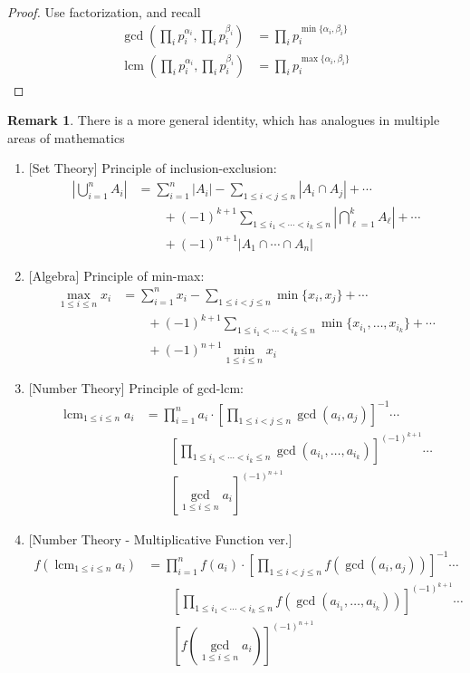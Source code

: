 \documentclass{article}
\theoremstyle{definition}
\newtheorem{remark}[theorem]{Remark}
\begin{document}
\begin{proof}
Use factorization, and recall
\begin{align*}
\gcd \left( \prod_i p_i^{\alpha_i}, \prod_i p_i^{\beta_i} \right) & = \prod_i p_i^{\min \{ \alpha_i, \beta_i \}}
\\
\operatorname{lcm} \left( \prod_i p_i^{\alpha_i}, \prod_i p_i^{\beta_i} \right) & = \prod_i p_i^{\max \{ \alpha_i, \beta_i \}}
\end{align*}
\end{proof}
\begin{remark}
There is a more general identity, which has analogues in multiple areas of mathematics
\begin{enumerate}
	\item {[Set Theory]} Principle of inclusion-exclusion:
	\begin{align*}
	\left| \bigcup_{i = 1}^n A_i \right| & = \sum_{i = 1}^n |A_i| - \sum_{1 \leq i < j \leq n} |A_i \cap A_j| + \cdots
	\\
	& \qquad + (-1)^{k + 1} \sum_{1 \leq i_1 < \cdots < i_k \leq n} \left| \bigcap_{\ell = 1}^k A_\ell \right| + \cdots
	\\
	& \qquad + (-1)^{n + 1} |A_1 \cap \cdots \cap A_n|
	\end{align*}
	\item {[Algebra]} Principle of min-max:
	\begin{align*}
	\max_{1 \leq i \leq n} x_i & = \sum_{i = 1}^n x_i - \sum_{1 \leq i < j \leq n} \min \{ x_i, x_j \} + \cdots
	\\
	& \qquad + (-1)^{k + 1} \sum_{1 \leq i_1 < \cdots < i_k \leq n} \min \{ x_{i_1}, \hdots, x_{i_k} \} + \cdots
	\\
	& \qquad + (-1)^{n + 1} \min_{1 \leq i \leq n} x_i
	\end{align*}
	\item {[Number Theory]} Principle of gcd-lcm:
	\begin{align*}
	\operatorname{lcm}_{1 \leq i \leq n} a_i & = \prod_{i = 1}^n a_i \cdot \left[ \prod_{1 \leq i < j \leq n} \gcd(a_i, a_j) \right]^{-1} \cdots
	\\
	& \qquad \left[ \prod_{1 \leq i_1 < \cdots < i_k \leq n} \gcd(a_{i_1}, \hdots, a_{i_k}) \right]^{(-1)^{k + 1}} \cdots
	\\
	& \qquad \left[ \gcd_{1 \leq i \leq n} a_i \right]^{(-1)^{n + 1}}
	\end{align*}
	\item {[Number Theory - Multiplicative Function ver.]}
	\begin{align*}
	f \left( \operatorname{lcm}_{1 \leq i \leq n} a_i \right) & = \prod_{i = 1}^n f(a_i) \cdot \left[ \prod_{1 \leq i < j \leq n} f \left( \gcd(a_i, a_j) \right) \right]^{-1} \cdots
	\\
	& \qquad \left[ \prod_{1 \leq i_1 < \cdots < i_k \leq n} f \left( \gcd(a_{i_1}, \hdots, a_{i_k}) \right) \right]^{(-1)^{k + 1}} \cdots
	\\
	& \qquad \left[ f \left( \gcd_{1 \leq i \leq n} a_i \right) \right]^{(-1)^{n + 1}}
	\end{align*}
\end{enumerate}
\end{remark}
\end{document}
